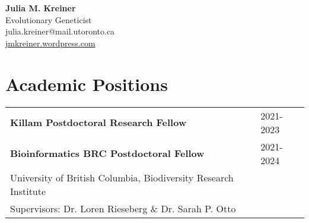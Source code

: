 \documentclass[12pt]{article}
\begin{document}
\thispagestyle{empty} 
\pagestyle{fancy}

{\raggedleft
\noindent\Large{\textbf{Julia M. Kreiner}}\\
\large Evolutionary Geneticist\\
\large julia.kreiner@mail.utoronto.ca\\
\href{https://jmkreiner.wordpress.com}{jmkreiner.wordpress.com}\\
}



%

\section*{Academic Positions}

\begin{tabular}{ll}
\textbf{Killam Postdoctoral Research Fellow\hspace{7.8cm}} & 2021-2023 \\
\textbf{Bioinformatics BRC Postdoctoral Fellow} & 2021-2024 \\
\hspace{1.2cm} University of British Columbia, Biodiversity Research Institute \\
\hspace{1.2cm} Supervisors: Dr. Loren Rieseberg \& Dr. Sarah P. Otto \\
\end{tabular}
\end{document}
